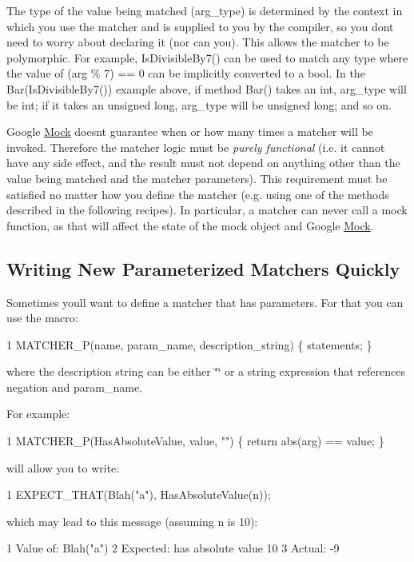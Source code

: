 \begin{DoxyEnumerate}
\item The type of the value being matched ({\ttfamily arg\+\_\+type}) is determined by the context in which you use the matcher and is supplied to you by the compiler, so you don\textquotesingle{}t need to worry about declaring it (nor can you). This allows the matcher to be polymorphic. For example, {\ttfamily Is\+Divisible\+By7()} can be used to match any type where the value of {\ttfamily (arg \% 7) == 0} can be implicitly converted to a {\ttfamily bool}. In the {\ttfamily Bar(\+Is\+Divisible\+By7())} example above, if method {\ttfamily Bar()} takes an {\ttfamily int}, {\ttfamily arg\+\_\+type} will be {\ttfamily int}; if it takes an {\ttfamily unsigned long}, {\ttfamily arg\+\_\+type} will be {\ttfamily unsigned long}; and so on.
\end{DoxyEnumerate}
\begin{DoxyEnumerate}
\item Google \hyperlink{class_mock}{Mock} doesn\textquotesingle{}t guarantee when or how many times a matcher will be invoked. Therefore the matcher logic must be {\itshape purely functional} (i.\+e. it cannot have any side effect, and the result must not depend on anything other than the value being matched and the matcher parameters). This requirement must be satisfied no matter how you define the matcher (e.\+g. using one of the methods described in the following recipes). In particular, a matcher can never call a mock function, as that will affect the state of the mock object and Google \hyperlink{class_mock}{Mock}.
\end{DoxyEnumerate}

\subsection*{Writing New Parameterized Matchers Quickly}

Sometimes you\textquotesingle{}ll want to define a matcher that has parameters. For that you can use the macro\+: 
\begin{DoxyCode}
1 MATCHER\_P(name, param\_name, description\_string) \{ statements; \}
\end{DoxyCode}
 where the description string can be either {\ttfamily \char`\"{}\char`\"{}} or a string expression that references {\ttfamily negation} and {\ttfamily param\+\_\+name}.

For example\+: 
\begin{DoxyCode}
1 MATCHER\_P(HasAbsoluteValue, value, "") \{ return abs(arg) == value; \}
\end{DoxyCode}
 will allow you to write\+: 
\begin{DoxyCode}
1 EXPECT\_THAT(Blah("a"), HasAbsoluteValue(n));
\end{DoxyCode}
 which may lead to this message (assuming {\ttfamily n} is 10)\+: 
\begin{DoxyCode}
1 Value of: Blah("a")
2 Expected: has absolute value 10
3   Actual: -9
\end{DoxyCode}


